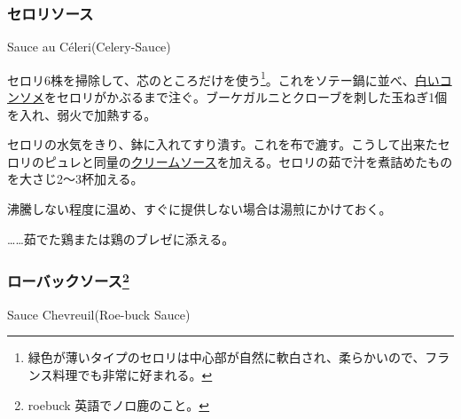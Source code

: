 \begin{recette}
\atoaki{}

\hypertarget{celery-sauce}{%
\subsubsection{セロリソース}\label{celery-sauce}}

\begin{frsubenv}

Sauce au Céleri\hspace{1em}\normalfont(Celery-Sauce)

\end{frsubenv}


セロリ6株を掃除して、芯のところだけを使う\footnote{緑色が薄いタイプのセロリは中心部が自然に軟白され、柔らかいので、フランス料理でも非常に好まれる。}。これをソテー鍋に並べ、\protect\hyperlink{}{白いコンソメ}をセロリがかぶるまで注ぐ。ブーケガルニとクローブを刺した玉ねぎ1個を入れ、弱火で加熱する。

セロリの水気をきり、鉢に入れてすり潰す。これを布で漉す。こうして出来たセロリのピュレと同量の\protect\hyperlink{cream-sauce}{クリームソース}を加える。セロリの茹で汁を煮詰めたものを大さじ2〜3杯加える。

沸騰しない程度に温め、すぐに提供しない場合は湯煎にかけておく。

\ldots{}\ldots{}茹でた鶏または鶏のブレゼに添える。

\atoaki{}

\hypertarget{roe-buck-sauce}{%
\subsubsection[ローバックソース]{\texorpdfstring{ローバックソース\footnote{roebuck
  英語でノロ鹿のこと。}}{ローバックソース}}\label{roe-buck-sauce}}

\begin{frsubenv}

Sauce Chevreuil\hspace{1em}\normalfont(Roe-buck Sauce)


\end{frsubenv}
\end{recette}
